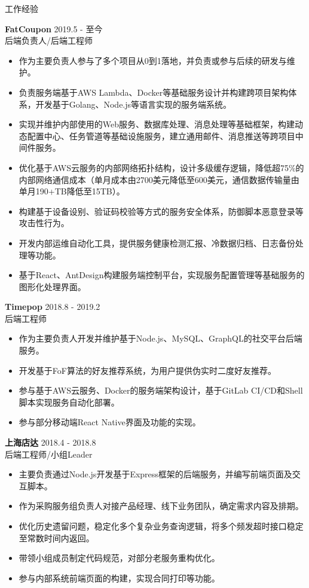 \documentclass{resume} %
\begin{document}
\begin{rSection}{工作经验}

\textbf{FatCoupon} \hfill 2019.5 - 至今\\
后端负责人/后端工程师 \hfill \textit{}
\begin{itemize}
  \itemsep -3pt {}
  \item 作为主要负责人参与了多个项目从0到1落地，并负责或参与后续的研发与维护。
  \item 负责服务端基于AWS Lambda、Docker等基础服务设计并构建跨项目架构体系，开发基于Golang、Node.js等语言实现的服务端系统。
  \item 实现并维护内部使用的Web服务、数据库处理、消息处理等基础框架，构建动态配置中心、任务管道等基础设施服务，建立通用邮件、消息推送等跨项目中间件服务。
  \item 优化基于AWS云服务的内部网络拓扑结构，设计多级缓存逻辑，降低超75\%的内部网络通信成本（单月成本由2700美元降低至600美元，通信数据传输量由单月190+TB降低至15TB）。
  \item 构建基于设备设别、验证码校验等方式的服务安全体系，防御脚本恶意登录等攻击性行为。
  \item 开发内部运维自动化工具，提供服务健康检测汇报、冷数据归档、日志备份处理等功能。
  \item 基于React、AntDesign构建服务端控制平台，实现服务配置管理等基础服务的图形化处理界面。
\end{itemize}

\textbf{Timepop} \hfill 2018.8 - 2019.2\\
后端工程师 \hfill \textit{}
\begin{itemize}
  \itemsep -3pt {}
  \item 作为主要负责人开发并维护基于Node.js、MySQL、GraphQL的社交平台后端服务。
  \item 开发基于FoF算法的好友推荐系统，为用户提供伪实时二度好友推荐。
  \item 参与基于AWS云服务、Docker的服务端架构设计，基于GitLab CI/CD和Shell脚本实现服务自动化部署。
  \item 参与部分移动端React Native界面及功能的实现。
\end{itemize}

\textbf{上海店达} \hfill 2018.4 - 2018.8\\
后端工程师/小组Leader \hfill \textit{}
\begin{itemize}
  \itemsep -3pt {}
  \item 主要负责通过Node.js开发基于Express框架的后端服务，并编写前端页面及交互脚本。
  \item 作为采购服务组负责人对接产品经理、线下业务团队，确定需求内容及排期。
  \item 优化历史遗留问题，稳定化多个复杂业务查询逻辑，将多个频发超时接口稳定至常数时间内返回。
  \item 带领小组成员制定代码规范，对部分老服务重构优化。
  \item 参与内部系统前端页面的构建，实现合同打印等功能。
\end{itemize}


\end{rSection}
\end{document}

